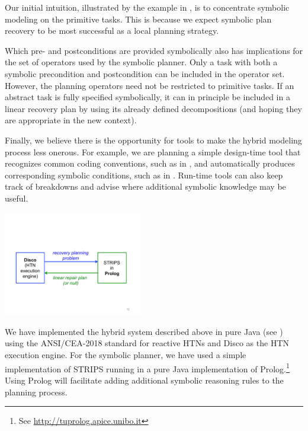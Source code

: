 \documentclass{llncs}
\begin{document}
Our initial intuition, illustrated by the example in
, is to concentrate symbolic modeling on the
primitive tasks.  This is because we expect symbolic plan recovery to
be most successful as a local planning strategy.

Which pre- and postconditions are provided symbolically also has
implications for the set of operators used by the symbolic planner.
Only a task with both a symbolic precondition and postcondition can be
included in the operator set.  However, the planning operators need
not be restricted to primitive tasks.  If an abstract task is fully
specified symbolically, it can in principle be included in a linear
recovery plan by using its already defined decompositions (and hoping
they are appropriate in the new context).

Finally, we believe there is the opportunity for tools to make the
hybrid modeling process less onerous.  For example, we are planning a
simple design-time tool that recognizes common coding conventions,
such as in , and automatically produces corresponding
symbolic conditions, such as in .  Run-time tools can
also keep track of breakdowns and advise where additional symbolic
knowledge may be useful.



\begin{floatingfigure}{2.5in}
\centerline{\includegraphics[width=2.4in]{figs/discolog}}
\end{floatingfigure} 

\noindent We have implemented the hybrid system described above in
pure Java (see ) using the ANSI/CEA-2018 standard
\cite{CETask} for reactive HTNs and Disco \cite{RichSidner2012} as the
HTN execution engine.  For the symbolic planner, we have used a simple
implementation of STRIPS running in a pure Java implementation of
Prolog.\footnote{See \url{http://tuprolog.apice.unibo.it}} Using
Prolog will facilitate adding additional symbolic reasoning rules to
the planning process.
\end{document}
